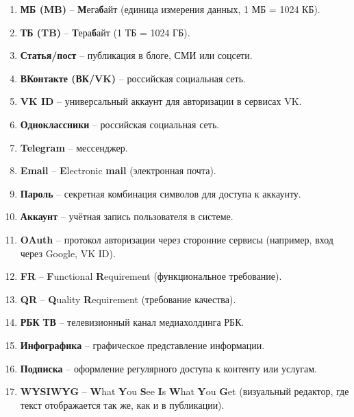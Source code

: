 \documentclass{scrreprt}
\begin{document}
\begin{enumerate}
\item\textbf{МБ (MB)} – \textbf{М}ега\textbf{б}айт (единица измерения данных, 1 МБ = 1024 КБ).

\item\textbf{ТБ (TB)} – \textbf{Т}ера\textbf{б}айт (1 ТБ = 1024 ГБ).

\item\textbf{Статья/пост} – публикация в блоге, СМИ или соцсети.

\item\textbf{ВКонтакте (ВК/VK)} – российская социальная сеть.

\item\textbf{VK ID} – универсальный аккаунт для авторизации в сервисах VK.

\item\textbf{Одноклассники} – российская социальная сеть.

\item\textbf{Telegram} – мессенджер.

\item\textbf{Email} – \textbf{E}lectronic \textbf{mail} (электронная почта).

\item\textbf{Пароль} – секретная комбинация символов для доступа к аккаунту.

\item\textbf{Аккаунт} – учётная запись пользователя в системе.

\item\textbf{OAuth} – протокол авторизации через сторонние сервисы (например, вход через Google, VK ID).

\item\textbf{FR} – \textbf{F}unctional \textbf{R}equirement (функциональное требование).

\item\textbf{QR} – \textbf{Q}uality \textbf{R}equirement (требование качества).

\item\textbf{РБК ТВ} – телевизионный канал медиахолдинга РБК.

\item\textbf{Инфографика} – графическое представление информации.

\item\textbf{Подписка} – оформление регулярного доступа к контенту или услугам.

\item\textbf{WYSIWYG} – \textbf{W}hat \textbf{Y}ou \textbf{S}ee \textbf{I}s \textbf{W}hat \textbf{Y}ou \textbf{G}et (визуальный редактор, где текст отображается так же, как и в публикации).


\end{enumerate}
\end{document}
